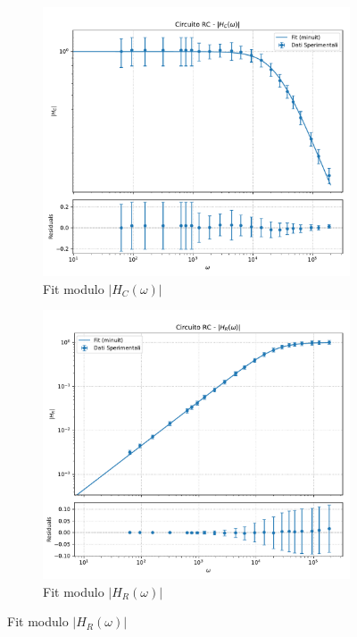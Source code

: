\documentclass[a4paper]{article}
\begin{document}
\begin{figure}[htbp] %
    \centering %

    \begin{subfigure}[b]{0.495\textwidth} %
        \centering
        \includegraphics[width=\linewidth]{grafici/rc_hc.pdf} %
        \caption{Fit modulo $|H_C(\omega)|$}
        \label{fig:rc_hc}
    \end{subfigure}
    \hfill %
    \begin{subfigure}[b]{0.495\textwidth}
        \centering
        \includegraphics[width=\linewidth]{grafici/rc_hr.pdf} %
        \caption{Fit modulo $|H_R(\omega)|$}
        \label{fig:rc_hr}
    \end{subfigure}


\end{figure}
\end{document}

